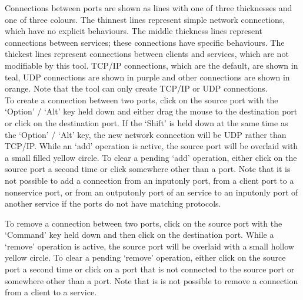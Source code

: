 Connections between ports are shown as lines with one of three thicknesses and one of
three colours.
The thinnest lines represent simple \yarp{} network connections, which have no explicit
behaviours.
The middle thickness lines represent connections between  services; these
connections have specific behaviours.
The thickest lines represent connections between clients and services, which are not
modifiable by this tool.
TCP/IP connections, which are the default, are shown in teal, UDP connections are shown in
purple and other connections are shown in orange.
Note that the tool can only create TCP/IP or UDP connections.\\

To create a connection between two ports, click on the source port with the `Option' /
`Alt' key held down and either drag the mouse to the destination port or click on the
destination port.
If the `Shift' is held down at the same time as the `Option' / `Alt' key, the new
network connection will be UDP rather than TCP/IP.
While an `add' operation is active, the source port will be overlaid with a small filled
yellow circle.
To clear a pending `add' operation, either click on the source port a second time or click
somewhere other than a port.
Note that it is not possible to add a connection from an input\longDash{}only port, from a
client port to a non\longDash{}service port, or from an output\longDash{}only port of an
 service to an input\longDash{}only port of another  service
if the ports do not have matching protocols.


\clearpage
{}

To remove a connection between two ports, click on the source port with the `Command' key
held down and then click on the destination port.
While a `remove' operation is active, the source port will be overlaid with a small
hollow yellow circle.
To clear a pending `remove' operation, either click on the source port a second time or
click on a port that is not connected to the source port or somewhere other than a port.
Note that is is not possible to remove a connection from a client to a service.

